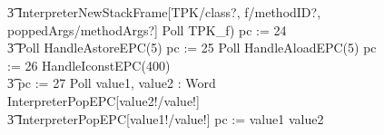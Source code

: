 \begin{figure}[tp!]
{\begin{circus}
    \t3 \lschexpract InterpreterNewStackFrame[TPK/class?, f/methodID?, poppedArgs/methodArgs?] \rschexpract \circseq Poll \circseq TPK\_f) \circseq pc := 24 \circseq \\
    \t3 Poll \circseq HandleAstoreEPC(5) \circseq pc := 25 \circseq Poll \circseq HandleAloadEPC(5) \circseq pc := 26 \circseq HandleIconstEPC(400) \circseq \\
    \t3 pc := 27 \circseq Poll \circseq \circvar value1, value2 : Word \circspot \lschexpract InterpreterPopEPC[value2!/value!] \rschexpract \circseq \\
    \t3 \lschexpract InterpreterPopEPC[value1!/value!] \rschexpract \circseq pc := \IF value1 \leq value2   \\

\end{circus}}
\end{figure}
